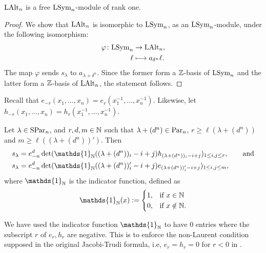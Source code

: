 \documentclass[11pt]{amsart}
\begin{document}
\begin{cor}
    $\mathrm{LAlt}_n$ is a free $\mathrm{LSym}_n$-module of rank one. 
\end{cor}

\begin{proof}
    We show that $\mathrm{LAlt}_n$ is isomorphic to $\mathrm{LSym}_n$, as an $\mathrm{LSym}_n$-module, under the following isomorphism:
    \begin{align*}
        \varphi \colon \mathrm{LSym}_n &\rightarrow \mathrm{LAlt}_n, \\
        \ell &\longmapsto a_{\delta^n}\ell.
    \end{align*}
    The map $\varphi$ sends $s_\lambda$ to $a_{\lambda+\delta^n}$.
    Since the former form a $\mathbb{Z}$-basis of $\mathrm{LSym}_n$ and the latter form a $\mathbb{Z}$-basis of $\mathrm{LAlt}_n$, the statement follows. 
\end{proof}

Recall that $e_{-r}(x_1, \dots, x_n)=e_r(x_1^{-1}, \dots, x_n^{-1})$. Likewise, let $h_{-r}(x_1, \dots, x_n)=h_r(x_1^{-1}, \dots, x_n^{-1})$. 
\begin{prop}\label{prop:schur_det}
    Let $\lambda \in \mathrm{SPar}_n$, and \(r,d,m \in \mathbb{N}\) such that \(\lambda + (d^n) \in \mathrm{Par}_n\), $r \geq \ell(\lambda + (d^n))$ and $m\geq \ell((\lambda + (d^n))')$. Then
    \begin{align*}
        s_{\lambda} &= e_{-n}^d \det(\mathds{1}_{\N}((\lambda + (d^n))_i - i + j)h_{(\lambda + (d^n))_i - i + j})_{1\leq i,j\leq r},
        \qquad \text{and}
    \\
         s_{\lambda} &= e_{-n}^d \det(\mathds{1}_{\N}((\lambda + (d^n))'_i - i + j)e_{(\lambda + (d^n))'_i - i + j})_{1\leq i,j\leq m},
         \end{align*}
    where $\mathds{1}_\N$ is the indicator function, defined as
    \begin{align*}
        \mathds{1}_\N(x) := \begin{cases}
            1, & \text{if } x \in \N\\ 0,& \text{if } x \notin \N.
        \end{cases}
    \end{align*}
\end{prop}
\begin{rem} We have used the indicator function $\mathds{1}_\N$ to have 0 entries where the subscript $r$ of $e_r,h_r$ are negative. This is to enforce the non-Laurent condition supposed in the original Jacobi-Trudi formula, i.e, $e_r=h_r=0$ for $r<0$ in \cite[Ch.~I, \S 3, Eqs.3.4-3.5]{Mac15}.
\end{rem}
\end{document}
